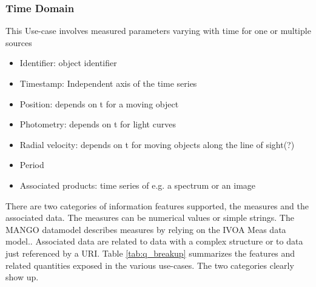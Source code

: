 \documentclass[11pt,a4paper]{ivoa}
\begin{document}
\subsubsection{Time Domain }

This Use-case involves measured parameters varying with time
for one or multiple sources

 \begin{itemize}
    \item Identifier: object identifier
    \item Timestamp: Independent axis of the time series
    \item Position: depends on t for a moving object
    \item Photometry: depends on t for light curves
    \item Radial velocity: depends on t for moving objects along the line of sight(?)
    \item Period
    \item Associated products: time series of e.g. a spectrum or an image

\end{itemize}

There are two categories of information features supported, the measures and the associated data. The measures
 can be numerical values or simple strings. The MANGO datamodel describes measures by relying on the IVOA Meas data model.\cite{MEAS}. Associated data are related to data with a complex structure or to data just referenced by a URI. Table  \ref{tab:q_breakup} summarizes the features and related quantities exposed in the various use-cases. The two categories clearly show up.
\end{document}
